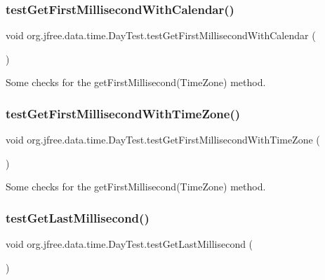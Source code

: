 \subsubsection{\texorpdfstring{test\+Get\+First\+Millisecond\+With\+Calendar()}{testGetFirstMillisecondWithCalendar()}}
{\footnotesize\ttfamily void org.\+jfree.\+data.\+time.\+Day\+Test.\+test\+Get\+First\+Millisecond\+With\+Calendar (\begin{DoxyParamCaption}{ }\end{DoxyParamCaption})}

Some checks for the get\+First\+Millisecond(\+Time\+Zone) method. \mbox{\label{classorg_1_1jfree_1_1data_1_1time_1_1_day_test_aa883332d7687591065234728c2758ee5}} 
\subsubsection{\texorpdfstring{test\+Get\+First\+Millisecond\+With\+Time\+Zone()}{testGetFirstMillisecondWithTimeZone()}}
{\footnotesize\ttfamily void org.\+jfree.\+data.\+time.\+Day\+Test.\+test\+Get\+First\+Millisecond\+With\+Time\+Zone (\begin{DoxyParamCaption}{ }\end{DoxyParamCaption})}

Some checks for the get\+First\+Millisecond(\+Time\+Zone) method. \mbox{\label{classorg_1_1jfree_1_1data_1_1time_1_1_day_test_a6b92872cc7b2e1aa6613f6c22b3f3322}} 
\subsubsection{\texorpdfstring{test\+Get\+Last\+Millisecond()}{testGetLastMillisecond()}}
{\footnotesize\ttfamily void org.\+jfree.\+data.\+time.\+Day\+Test.\+test\+Get\+Last\+Millisecond (\begin{DoxyParamCaption}{ }\end{DoxyParamCaption})}

